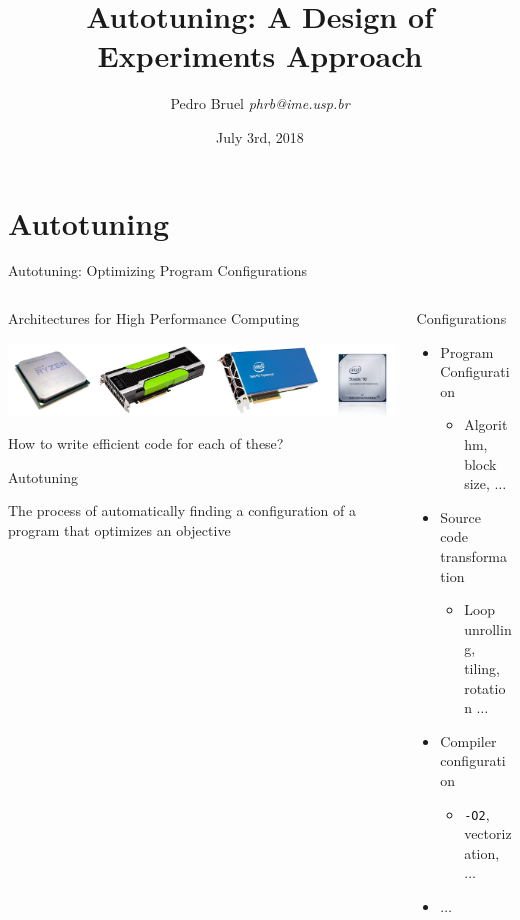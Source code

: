\documentclass[10pt, compress, aspectratio=169, xcolor={table,usenames,dvipsnames}]{beamer}
\author{\footnotesize Pedro Bruel \newline \scriptsize \emph{phrb@ime.usp.br}}
\date{\scriptsize July 3rd, 2018}
\title{Autotuning: A Design of Experiments Approach}
\begin{document}
\maketitle

\section{Autotuning}
\label{sec:org654498e}
\begin{frame}[fragile,label={sec:orgab18b09}]{Autotuning: Optimizing Program Configurations}
 \begin{columns}
\begin{column}{0.5\columnwidth}
\begin{block}{Architectures for High Performance Computing}
\begin{center}
\includegraphics[width=.9\linewidth]{../img/architectures.png}
\end{center}

How to write \alert{efficient code} for each of these?

\begin{block}{Autotuning}
\vspace{.2cm}

The process of \alert{automatically finding} a \alert{configuration} of a program that
optimizes an \alert{objective}
\end{block}
\end{block}
\end{column}

\begin{column}{0.5\columnwidth}
\begin{block}{Configurations}
\begin{itemize}
\item Program Configuration
\begin{itemize}
\item Algorithm, block size, \(\dots\)
\end{itemize}
\item \colorbox{Accent!25}{Source code transformation}
\begin{itemize}
\item Loop unrolling, tiling, rotation \(\dots\)
\end{itemize}
\item Compiler configuration
\begin{itemize}
\item \texttt{-O2}, vectorization, \(\dots\)
\end{itemize}
\item \(\dots\)
\end{itemize}


\end{block}
\end{column}
\end{columns}
\end{frame}
\end{document}
